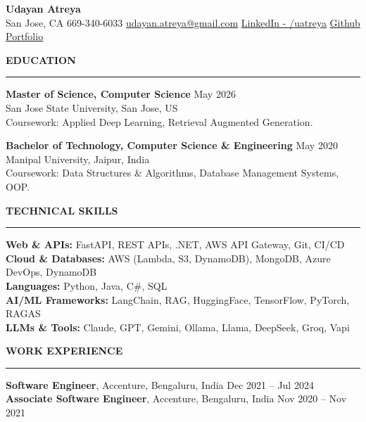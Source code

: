 \documentclass[letterpaper,10.5pt]{extarticle}
\newcommand{\resumesection}[1]{%
    \vspace{6pt}%
    \noindent\textbf{#1}\vspace{-5pt}%
    \\\noindent\rule{\textwidth}{0.5pt}%
    \vspace{1pt}%
}
\begin{document}
\begin{center}
    {\LARGE\textbf{Udayan Atreya}}\\[3pt]
    {\fontsize{11}{13.2}\selectfont
    San Jose, CA \textbar{} 669-340-6033 \textbar{}
    \href{mailto:udayan.atreya@gmail.com}{udayan.atreya@gmail.com} \textbar{}
    \href{https://www.linkedin.com/in/uatreya/}{LinkedIn - /uatreya} \textbar{}
    \href{https://github.com/slowloris-98/}{Github} \textbar{}
    \href{https://udayan-atreya.vercel.app/}{Portfolio}}
\end{center}

\resumesection{EDUCATION}

\noindent\textbf{Master of Science, Computer Science} \hfill May 2026\\
San Jose State University, San Jose, US\\
Coursework: Applied Deep Learning, Retrieval Augmented Generation.

\vspace{5pt}

\noindent\textbf{Bachelor of Technology, Computer Science \& Engineering} \hfill May 2020\\
Manipal University, Jaipur, India\\
Coursework: Data Structures \& Algorithms, Database Management Systems, OOP.

\resumesection{TECHNICAL SKILLS}

\noindent\textbf{Web \& APIs:} FastAPI, REST APIs, .NET, AWS API Gateway, Git, CI/CD\\
\noindent\textbf{Cloud \& Databases:} AWS (Lambda, S3, DynamoDB), MongoDB, Azure DevOps, DynamoDB\\
\noindent\textbf{Languages:} Python, Java, C\#, SQL\\
\noindent\textbf{AI/ML Frameworks:} LangChain, RAG, HuggingFace, TensorFlow, PyTorch, RAGAS\\
\noindent\textbf{LLMs \& Tools:} Claude, GPT, Gemini, Ollama, Llama, DeepSeek, Groq, Vapi

\resumesection{WORK EXPERIENCE}

\noindent\textbf{Software Engineer}, Accenture, Bengaluru, India \hfill Dec 2021 -- Jul 2024\\
\textbf{Associate Software Engineer}, Accenture, Bengaluru, India \hfill Nov 2020 -- Nov 2021
\end{document}
